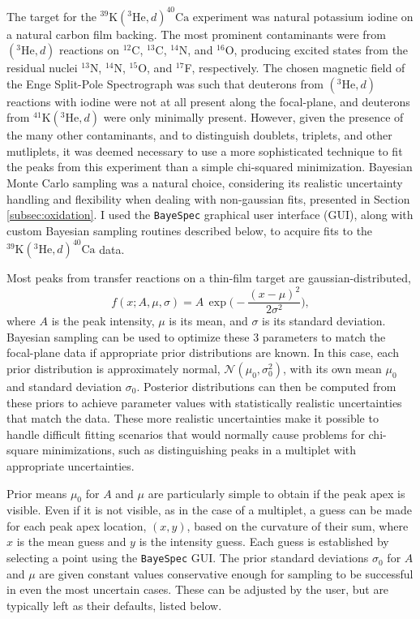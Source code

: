 The target for the $^{39}\mathrm{K}(^{3}\mathrm{He}, d)^{40}\mathrm{Ca}$ experiment was natural potassium iodine on a natural carbon film backing. The most prominent contaminants were from $(^{3}\mathrm{He}, d)$ reactions on $^{12}$C, $^{13}$C, $^{14}$N, and $^{16}$O, producing excited states from the residual nuclei $^{13}$N, $^{14}$N, $^{15}$O, and $^{17}$F, respectively. The chosen magnetic field of the Enge Split-Pole Spectrograph was such that deuterons from $(^{3}\mathrm{He}, d)$ reactions with iodine were not at all present along the focal-plane, and deuterons from $^{41}\mathrm{K}(^{3}\mathrm{He}, d)$ were only minimally present. However, given the presence of the many other contaminants, and to distinguish doublets, triplets, and other mutliplets, it was deemed necessary to use a more sophisticated technique to fit the peaks from this experiment than a simple chi-squared minimization. Bayesian Monte Carlo sampling was a natural choice, considering its realistic uncertainty handling and flexibility when dealing with non-gaussian fits, presented in Section \ref{subsec:oxidation}. I used the \texttt{BayeSpec} \cite{BayeSpec} graphical user interface (GUI), along with custom Bayesian sampling routines described below, to acquire fits to the $^{39}\mathrm{K}(^{3}\mathrm{He}, d)^{40}\mathrm{Ca}$ data.

Most peaks from transfer reactions on a thin-film target are gaussian-distributed,
\begin{equation}
    f(x;A,\mu,\sigma) = A \, \exp \Big( -\frac{(x-\mu)^{2}}{2\sigma^{2}} \Big),
\end{equation}
where $A$ is the peak intensity, $\mu$ is its mean, and $\sigma$ is its standard deviation.
Bayesian sampling can be used to optimize these 3 parameters to match the focal-plane data if appropriate prior distributions are known. In this case, each prior distribution is approximately normal, $\mathcal{N}(\mu_{0},\sigma_{0}^{2})$, with its own mean $\mu_{0}$ and standard deviation $\sigma_{0}$. Posterior distributions can then be computed from these priors to achieve parameter values with statistically realistic uncertainties that match the data. These more realistic uncertainties make it possible to handle difficult fitting scenarios that would normally cause problems for chi-square minimizations, such as distinguishing peaks in a multiplet with appropriate uncertainties.

Prior means $\mu_{0}$ for $A$ and $\mu$ are particularly simple to obtain if the peak apex is visible. Even if it is not visible, as in the case of a multiplet, a guess can be made for each peak apex location, $(x,y)$, based on the curvature of their sum, where $x$ is the mean guess and $y$ is the intensity guess. Each guess is established by selecting a point using the \texttt{BayeSpec} GUI. The prior standard deviations $\sigma_{0}$ for $A$ and $\mu$ are given constant values conservative enough for sampling to be successful in even the most uncertain cases. These can be adjusted by the user, but are typically left as their defaults, listed below.

